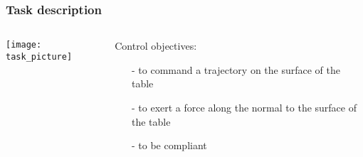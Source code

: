 \begin{frame}
  \frametitle{Task description}
  \begin{columns}
    \begin{column}{0.45\textwidth}
      \centering
      \texttt{[image: task\_picture]}
    \end{column}
    \begin{column}{0.5\textwidth}
      Control objectives:
      \begin{itemize}
      \item[-] to command a trajectory on the surface of the table
      \item[-] to exert a force along the normal to the surface of the table
      \item[-] to be compliant
      \end{itemize}
    \end{column}
  \end{columns}
\end{frame}
